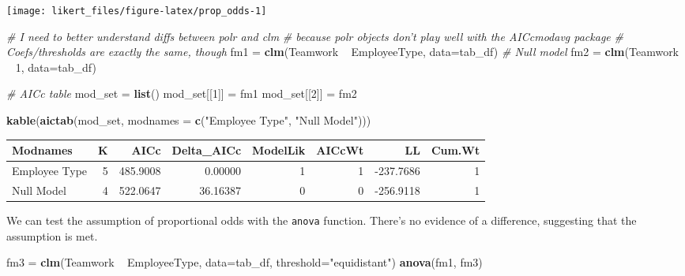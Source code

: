 \documentclass[]{book}
\newenvironment{Shaded}{\begin{snugshade}}{\end{snugshade}}
\newcommand{\KeywordTok}[1]{\textcolor[rgb]{0.13,0.29,0.53}{\textbf{{#1}}}}
\newcommand{\DataTypeTok}[1]{\textcolor[rgb]{0.13,0.29,0.53}{{#1}}}
\newcommand{\DecValTok}[1]{\textcolor[rgb]{0.00,0.00,0.81}{{#1}}}
\newcommand{\StringTok}[1]{\textcolor[rgb]{0.31,0.60,0.02}{{#1}}}
\newcommand{\CommentTok}[1]{\textcolor[rgb]{0.56,0.35,0.01}{\textit{{#1}}}}
\newcommand{\NormalTok}[1]{{#1}}
\begin{document}
\begin{center}\texttt{[image: likert\_files/figure-latex/prop\_odds-1]} \end{center}

\begin{Shaded}
\begin{Highlighting}[]
\CommentTok{# I need to better understand diffs between polr and clm}
\CommentTok{# because polr objects don't play well with the AICcmodavg package}
\CommentTok{# Coefs/thresholds are exactly the same, though}
\NormalTok{fm1 =}\StringTok{ }\KeywordTok{clm}\NormalTok{(Teamwork ~}\StringTok{ }\NormalTok{EmployeeType, }\DataTypeTok{data=}\NormalTok{tab_df)}
\CommentTok{# Null model}
\NormalTok{fm2 =}\StringTok{ }\KeywordTok{clm}\NormalTok{(Teamwork ~}\StringTok{ }\DecValTok{1}\NormalTok{, }\DataTypeTok{data=}\NormalTok{tab_df)}

\CommentTok{# AICc table}
\NormalTok{mod_set =}\StringTok{ }\KeywordTok{list}\NormalTok{()}
    \NormalTok{mod_set[[}\DecValTok{1}\NormalTok{]] =}\StringTok{ }\NormalTok{fm1}
    \NormalTok{mod_set[[}\DecValTok{2}\NormalTok{]] =}\StringTok{ }\NormalTok{fm2}

\KeywordTok{kable}\NormalTok{(}\KeywordTok{aictab}\NormalTok{(mod_set, }\DataTypeTok{modnames =} \KeywordTok{c}\NormalTok{(}\StringTok{"Employee Type"}\NormalTok{, }\StringTok{"Null Model"}\NormalTok{)))}
\end{Highlighting}
\end{Shaded}

\begin{tabular}{l|r|r|r|r|r|r|r}
\hline
Modnames & K & AICc & Delta\_AICc & ModelLik & AICcWt & LL & Cum.Wt\\
\hline
Employee Type & 5 & 485.9008 & 0.00000 & 1 & 1 & -237.7686 & 1\\
\hline
Null Model & 4 & 522.0647 & 36.16387 & 0 & 0 & -256.9118 & 1\\
\hline
\end{tabular}

We can test the assumption of proportional odds with the \texttt{anova}
function. There's no evidence of a difference, suggesting that the
assumption is met.

\begin{Shaded}
\begin{Highlighting}[]
\NormalTok{fm3 =}\StringTok{ }\KeywordTok{clm}\NormalTok{(Teamwork ~}\StringTok{ }\NormalTok{EmployeeType, }\DataTypeTok{data=}\NormalTok{tab_df, }\DataTypeTok{threshold=}\StringTok{"equidistant"}\NormalTok{)}
\KeywordTok{anova}\NormalTok{(fm1, fm3)}
\end{Highlighting}
\end{Shaded}
\end{document}

